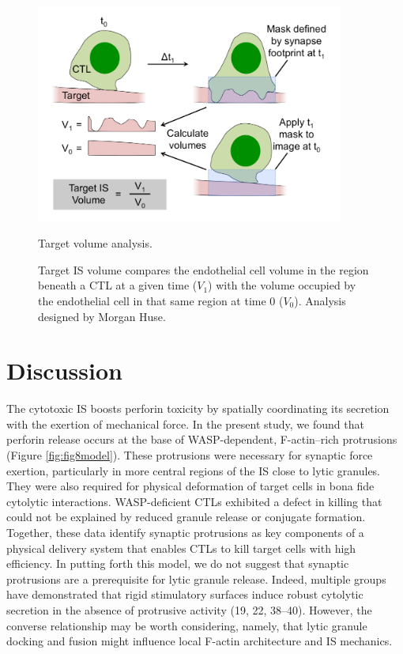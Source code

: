 \begin{figure}[htbp]
	\centering
	\includegraphics[width=0.9\textwidth]{../figures/chapter2/fig7supp2.png}
	\caption{Target volume analysis.}
	\caption*{Target IS volume compares the endothelial cell volume in the region beneath a CTL at a given time ($V_1$) with the volume occupied by the endothelial cell in that same region at time 0 ($V_0$). Analysis designed by Morgan Huse.}
	\label{fig:fig7supp2}
\end{figure}


\section{Discussion}
The cytotoxic IS boosts perforin toxicity by spatially coordinating its secretion with the exertion of mechanical force. In the present study, we found that perforin release occurs at the base of WASP-dependent, F-actin–rich protrusions (Figure \ref{fig:fig8model}). These protrusions were necessary for synaptic force exertion, particularly in more central regions of the IS close to lytic granules. They were also required for physical deformation of target cells in bona fide cytolytic interactions. WASP-deficient CTLs exhibited a defect in killing that could not be explained by reduced granule release or conjugate formation. Together, these data identify synaptic protrusions as key components of a physical delivery system that enables CTLs to kill target cells with high efficiency. In putting forth this model, we do not suggest that synaptic protrusions are a prerequisite for lytic granule release. Indeed, multiple groups have demonstrated that rigid stimulatory surfaces induce robust cytolytic secretion in the absence of protrusive activity (19, 22, 38–40). However, the converse relationship may be worth considering, namely, that lytic granule docking and fusion might influence local F-actin architecture and IS mechanics.


